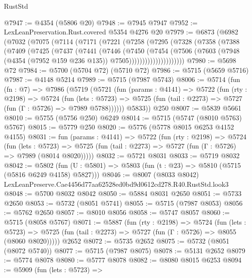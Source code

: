 \begin{lexlean}{RustStd}
\begin{coremodule}
@7947 := @4354 (@5806 @20)
@7948 := @7945 @7947
@7952 := LexLeanPreservation.Rust.covered @5354 @4276 @20
@7979 := @6873
    (@6982
      (@7032
        (@7075
          (@7114
            (@7171
              (@7221
                (@7258
                  (@7295
                    (@7328
                      (@7358
                        (@7388
                          (@7409
                            (@7425
                              (@7437
                                (@7441
                                  (@7446
                                    (@7450
                                      (@7454
                                        (@7506
                                          (@7603
                                            (@7948
                                              (@4354 (@7952 @159 @236 @135))
                                              @7505)))))))))))))))))))))
@7980 := @5698 @72
@7984 := @5700 (@5704 @72) (@5710 @72)
@7986 := @5715 (@5659 @5716)
@7987 := @4148 @5214
@7989 := @5715 (@7987 @5743)
@8006 := @5714
    (fun (fn : @7) =>
    @7986
      (@5719
        (@5721
          (fun (params : @4141) =>
          @5722
            (fun (rty : @2198) =>
            @5724
              (fun (lets : @5723) =>
              @5725 (fun (tail : @2273) => @5727 (fun (Γ : @5726) => @7989 @5788))))))
        @5833))
    @250
@8007 := @5839 @5661
@8010 := @5755 (@5756 @250) @6249
@8014 := @5715 (@5747 (@8010 @5763) @5767)
@8015 := @5779 @250
@8020 := @5776 (@5778 @8015 @6253 @4152 @4155)
@8031 := fun (params : @4141) =>
  @5722
    (fun (rty : @2198) =>
    @5724
      (fun (lets : @5723) =>
      @5725 (fun (tail : @2273) => @5727 (fun (Γ : @5726) => @7989 (@8014 @8020)))))
@8032 := @5721 @8031
@8033 := @5719 @8032
@8042 := @5802 (fun (U : @5801) => @5803 (fun (t : @23) => @5810 (@5715 (@5816 @6249 @4158) @5827)))
@8046 := @8007 (@8033 @8042) LexLeanPreserve.Cae4456d77aa62528ed0bd9d0612cd278.R40.RustStd.look3
@8048 := @5700 @8032 @8042
@8050 := @5884 @8031 @2650
@8051 := @5733 @2650
@8053 := @5732 (@8051 @5741)
@8055 := @5715 (@7987 @8053)
@8056 := @5762 @2650
@8057 := @8010 @8056
@8058 := @5747 @8057
@8060 := @5715 (@8058 @5767)
@8071 := @5887
    (fun (rty : @2198) =>
    @5724
      (fun (lets : @5723) =>
      @5725 (fun (tail : @2273) => @5727 (fun (Γ : @5726) => @8055 (@8060 @8020)))))
    @2652
@8072 := @5735 @2652
@8075 := @5732 (@8051 (@8072 @5740))
@8077 := @5715 (@7987 @8075)
@8078 := @5131 @2652
@8079 := @5774 @8078
@8080 := @5777 @8078
@8082 := @8080 @8015 @6253
@8094 := @5909
    (fun (lets : @5723) =>

\end{coremodule}
\end{lexlean}

